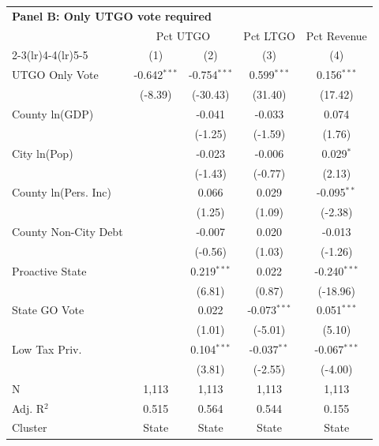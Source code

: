 \begingroup
\centering
\begin{tabular*}{\textwidth}{@{\extracolsep{\fill}}lcccc}
\multicolumn{5}{l}{\textbf{Panel B: Only UTGO vote required}}\\

\addlinespace
   \toprule
    & \multicolumn{2}{c}{Pct UTGO} & Pct LTGO & Pct Revenue\\
   \cmidrule(lr){2-3}\cmidrule(lr){4-4}\cmidrule(lr){5-5}
                        & (1)            & (2)            & (3)            & (4)\\  
   \midrule 
   UTGO Only Vote       & -0.642$^{***}$ & -0.754$^{***}$ & 0.599$^{***}$  & 0.156$^{***}$\\   
                        & (-8.39)       & (-30.43)      & (31.40)       & (17.42)\\   
   County ln(GDP)       &                & -0.041         & -0.033         & 0.074\\   
                        &                & (-1.25)       & (-1.59)       & (1.76)\\   
   City ln(Pop)         &                & -0.023         & -0.006         & 0.029$^{*}$\\   
                        &                & (-1.43)       & (-0.77)       & (2.13)\\   
   County ln(Pers. Inc) &                & 0.066          & 0.029          & -0.095$^{**}$\\   
                        &                & (1.25)        & (1.09)        & (-2.38)\\   
   County Non-City Debt &                & -0.007         & 0.020          & -0.013\\   
                        &                & (-0.56)       & (1.03)        & (-1.26)\\   
   Proactive State      &                & 0.219$^{***}$  & 0.022          & -0.240$^{***}$\\   
                        &                & (6.81)        & (0.87)        & (-18.96)\\   
   State GO Vote        &                & 0.022          & -0.073$^{***}$ & 0.051$^{***}$\\   
                        &                & (1.01)        & (-5.01)       & (5.10)\\   
   Low Tax Priv.        &                & 0.104$^{***}$  & -0.037$^{**}$  & -0.067$^{***}$\\   
                        &                & (3.81)        & (-2.55)       & (-4.00)\\   
   \hline
   N         & 1,113          & 1,113          & 1,113          & 1,113\\  
   Adj. R$^2$       & 0.515          & 0.564          & 0.544          & 0.155\\  
   Cluster              & State & State & State & State\\  
   \bottomrule
\end{tabular*}
\par\endgroup
